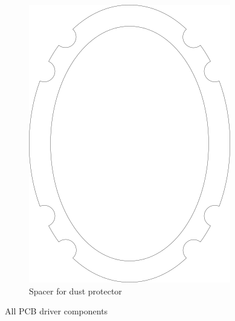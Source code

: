 \documentclass{article}
\begin{document}
\begin{figure}
\begin{subfigure}[b]{0.24\textwidth}
        \includegraphics[width=\textwidth]{images/spacer_dust.png}
        \caption{Spacer for dust protector}
        \label{f:driver:spacer_dust}
    \end{subfigure}
    \caption{All PCB driver components}
    \label{f:driver:components}
\end{figure}
\end{document}

